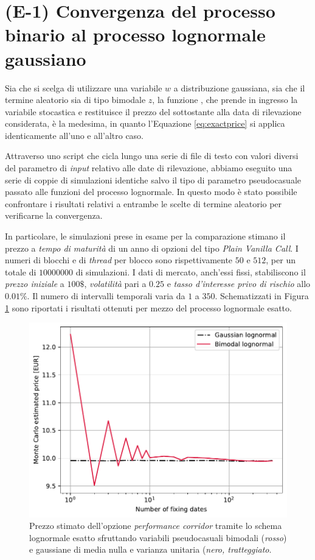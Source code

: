 \section{(E-1) Convergenza del processo binario al processo lognormale gaussiano}

Sia che si scelga di utilizzare una variabile $w$ a distribuzione gaussiana, sia che il termine aleatorio sia di tipo bimodale $z$, la funzione , che prende in ingresso la variabile stocastica e restituisce il prezzo del sottostante alla data di rilevazione considerata, è la medesima, in quanto l'Equazione \eqref{eq:exactprice} si applica identicamente all'uno e all'altro caso. 

Attraverso uno script che cicla lungo una serie di file di testo con valori diversi del parametro di \textit{input} relativo alle date di rilevazione, abbiamo eseguito una serie di coppie di simulazioni identiche salvo il tipo di parametro pseudocasuale passato alle funzioni del processo lognormale. In questo modo è stato possibile confrontare i risultati relativi a entrambe le scelte di termine aleatorio per verificarne la convergenza.

In particolare, le simulazioni prese in esame per la comparazione stimano il prezzo a \textit{tempo di maturità} di un anno di opzioni del tipo \textit{Plain Vanilla Call}. I numeri di blocchi e di \textit{thread} per blocco sono rispettivamente $50$ e $512$, per un totale di $10000000$ di simulazioni. I dati di mercato, anch'essi fissi, stabiliscono il \textit{prezzo iniziale} a $100\$$, \textit{volatilità} pari a $0.25$ e \textit{tasso d'interesse privo di rischio} allo $0.01\%$. Il numero di intervalli temporali varia da $1$ a $350$. Schematizzati in Figura \ref{fig:bimodal} sono riportati i risultati ottenuti per mezzo del processo lognormale esatto.

\begin{figure}[t]
    \centering
    \includegraphics[scale=0.5]{graphs/OptionPriceBimodal_PriceVsM.pdf}
    \caption{Prezzo stimato dell'opzione \textit{performance corridor} tramite lo schema lognormale esatto sfruttando variabili pseudocasuali bimodali (\textit{rosso}) e gaussiane di media nulla e varianza unitaria (\textit{nero, tratteggiato}.}
    \label{fig:bimodal}
\end{figure}

